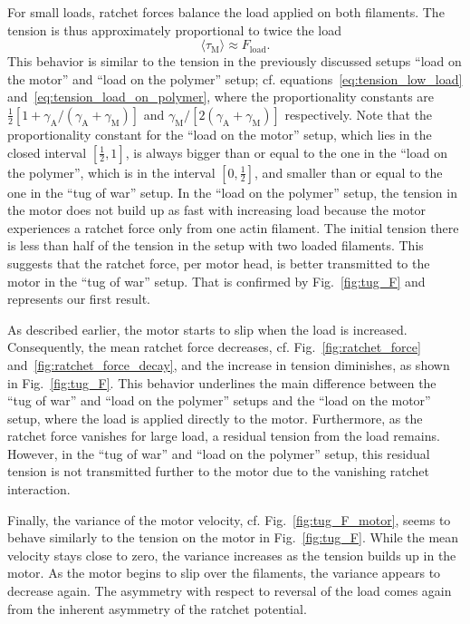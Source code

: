 \documentclass[aps,pre,twocolumn,showpacs,showkeys,superscriptaddress,floatfix]{revtex4-1}
\begin{document}
For small loads, ratchet forces balance the load applied on both filaments.  The tension is thus approximately proportional to twice the load 
\[
\langle \tau_\text{M} \rangle \approx F_\text{load} .
\] 
This behavior is similar to the tension in the previously discussed setups  ``load on the motor'' and ``load on the polymer'' setup; cf. equations~\eqref{eq:tension_low_load} and~\eqref{eq:tension_load_on_polymer}, 
where the proportionality constants are $ \frac{1}{2} [ 1 + \gamma_\text{A} / (\gamma_\text{A} + \gamma_\text{M} ) ] $ and $\gamma_\text{M} / [ 2 (\gamma_\text{A} + \gamma_\text{M} ) ]$ respectively. 
Note that the proportionality constant for the ``load on the motor'' setup, which lies in the closed interval $[\frac{1}{2},1]$, 
is always bigger than or equal to the one in the ``load on the polymer'', which is in the interval $[0,\frac{1}{2}]$, and smaller than or equal to the one in the ``tug of war'' setup. 
In the ``load on the polymer'' setup, the tension in the motor does not build up as fast with increasing load because the motor experiences a ratchet force only from one actin filament.
The initial tension there is less than half of the tension in the setup with two loaded filaments.
This suggests that the ratchet force, per motor head, is better transmitted to the motor in the ``tug of war'' setup.
That is confirmed by Fig.~\ref{fig:tug_F} and represents our first result.

As described earlier, the motor starts to slip when the load is increased.
Consequently, the mean ratchet force decreases, cf. Fig.~\ref{fig:ratchet_force} and~\ref{fig:ratchet_force_decay}, and the increase in tension diminishes, 
as shown in Fig.~\ref{fig:tug_F}.
This behavior underlines the main difference between the ``tug of war'' and ``load on the polymer'' setups and the ``load on the motor'' setup, 
where the load is applied directly to the motor. 
Furthermore, as the ratchet force vanishes for large load, a residual tension from the load remains.
However, in the ``tug of war'' and ``load on the polymer'' setup, this residual tension is not transmitted further to the motor due to the vanishing ratchet interaction.

Finally, the variance of the motor velocity, cf. Fig.~\ref{fig:tug_F_motor}, seems to behave similarly to the tension on the motor in Fig.~\ref{fig:tug_F}. 
While the mean velocity stays close to zero, the variance increases as the tension builds up in the motor. 
As the motor begins to slip over the filaments, the variance appears to decrease again.
The asymmetry with respect to reversal of the load comes again from the inherent asymmetry of the ratchet potential.
\end{document}
